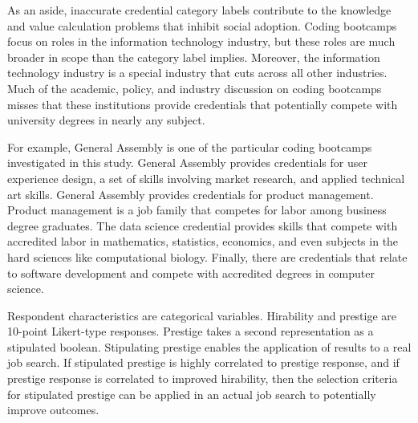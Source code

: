 \documentclass[review]{elsarticle}
\begin{document}
As an aside, inaccurate credential category labels contribute to the knowledge and value calculation problems that inhibit social adoption.
Coding bootcamps focus on roles in the information technology industry, but these roles are much broader in scope than the category label implies.
Moreover, the information technology industry is a special industry that cuts across all other industries.
Much of the academic, policy, and industry discussion on coding bootcamps misses that these institutions provide credentials that potentially compete with university degrees in nearly any subject.

For example, General Assembly is one of the particular coding bootcamps investigated in this study.
General Assembly provides credentials for user experience design, a set of skills involving market research, and applied technical art skills.
General Assembly provides credentials for product management.
Product management is a job family that competes for labor among business degree graduates.
The data science credential provides skills that compete with accredited labor in mathematics, statistics, economics, and even subjects in the hard sciences like computational biology.
Finally, there are credentials that relate to software development and compete with accredited degrees in computer science.


Respondent characteristics are categorical variables.
Hirability and prestige are 10-point Likert-type responses.
Prestige takes a second representation as a stipulated boolean.
Stipulating prestige enables the application of results to a real job search.
If stipulated prestige is highly correlated to prestige response,
and if prestige response is correlated to improved hirability,
then the selection criteria for stipulated prestige can be applied in an actual job search to potentially improve outcomes.
\end{document}
